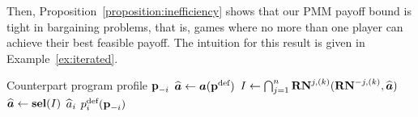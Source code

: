 \documentclass[sigconf]{aamas}
\newcommand{\selection}{sel}%
\newcommand{\renegb}{\mathbf{\selection}}
\theoremstyle{definition}
\begin{document}
\setcounter{theorem}{4}

Then, Proposition~\ref{proposition:inefficiency}
shows that
our PMM payoff bound is tight
in bargaining problems,
that is, games
where no more than one player can achieve
their best feasible payoff.
The intuition for this result is given
in Example~\ref{ex:iterated}.


\begin{algorithm}
\caption{
Iterated
conditional
set-valued
renegotiation
program $\progi \in \itspaceireni$, for some $\defprogi$}
\label{alg:icsr}
\begin{algorithmic}[1]
\Require Counterpart program profile $\textbf{p}_{-i}$
            \State 
             $\widehat{\boldsymbol{a}} \leftarrow \boldsymbol{a}({\textbf{p}}^{\textnormal{def}})$ %
        \EndIf
     
        \State ${I} \leftarrow \bigcap_{j = 1}^{{n}} \mathbf{RN}^{j,(k)}(\mathbf{RN}^{-j,(k)}, \widehat{\boldsymbol{a}})$
    \label{algline:firstagree}
             \State $\deffullact \leftarrow \renegb({I})$%
    \EndIf
    \EndFor
    \State \Return $\widehat{a}_i$
\Else
     \State \Return $p_i^{\textnormal{def}}(\textbf{p}_{-i})$  %
\EndIf
\end{algorithmic}
\end{algorithm}
\end{document}
